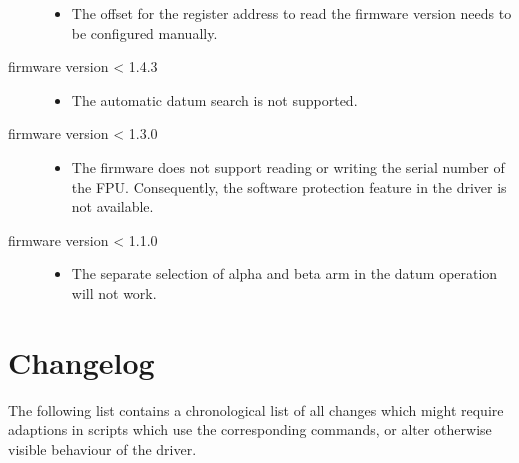 \documentclass[11pt,a4paper]{scrartcl}
\begin{document}
\begin{description}
\begin{itemize}
\item The offset for the register address to read the firmware version needs
  to be configured manually.
\end{itemize}

\item[firmware version < 1.4.3]
  
  \begin{itemize}
  \item The automatic datum search is not supported.
  \end{itemize}

\item[firmware version < 1.3.0]
  
  \begin{itemize}
  \item The firmware does not support reading or writing the serial number of the FPU.
    Consequently, the software protection feature in the driver is not available.
  \end{itemize}

\item[firmware version < 1.1.0]
  
  \begin{itemize}
  \item The separate selection of alpha and beta arm in the datum operation will not work.
  \end{itemize}
  
\end{description}


\section{Changelog}
\label{sec:changelog}

The following list contains a chronological list of all changes which
might require adaptions in scripts which use the corresponding
commands, or alter otherwise visible behaviour of the driver.
\end{document}
